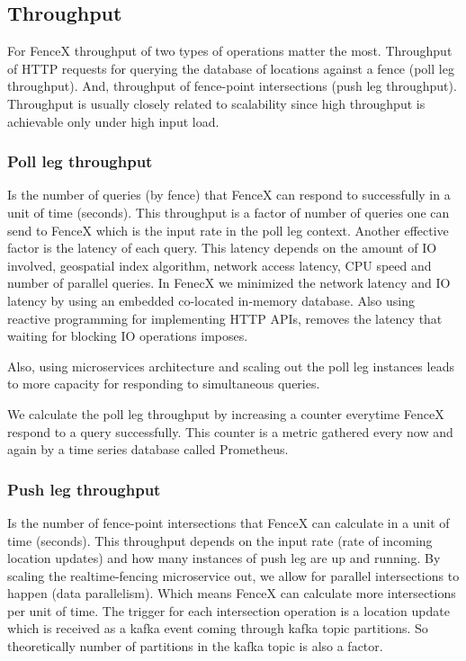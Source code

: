 \documentclass[a4]{report}
\begin{document}
    \subsection{Throughput}
    For FenceX throughput of two types of operations matter the most.
    Throughput of HTTP requests for querying the database of locations against a fence (poll leg throughput).
    And, throughput of fence-point intersections (push leg throughput).
    Throughput is usually closely related to scalability since high throughput is achievable only under high input load.

    \subsubsection{Poll leg throughput}
    Is the number of queries (by fence) that FenceX can respond to successfully in a unit of time (seconds).
    This throughput is a factor of number of queries one can send to FenceX which is the input rate in the poll leg context.
    Another effective factor is the latency of each query.
    This latency depends on the amount of IO involved, geospatial index algorithm, network access latency, CPU speed
    and number of parallel queries.
    In FenecX we minimized the network latency and IO latency by using an embedded co-located in-memory database.
    Also using reactive programming for implementing HTTP APIs, removes the latency that waiting for blocking IO
    operations imposes.

    Also, using microservices architecture and scaling out the poll leg instances leads to more capacity for responding
    to simultaneous queries.

    We calculate the poll leg throughput by increasing a counter everytime FenceX respond to a query successfully.
    This counter is a metric gathered every now and again by a time series database called Prometheus\cite{prometheus}.

    \subsubsection{Push leg throughput}
    Is the number of fence-point intersections that FenceX can calculate in a unit of time (seconds).
    This throughput depends on the input rate (rate of incoming location updates) and how many instances of push leg
    are up and running.
    By scaling the realtime-fencing microservice out, we allow for parallel intersections to happen (data parallelism).
    Which means FenceX can calculate more intersections per unit of time.
    The trigger for each intersection operation is a location update which is received as a kafka event coming through
    kafka topic partitions.
    So theoretically number of partitions in the kafka topic is also a factor.
\end{document}
